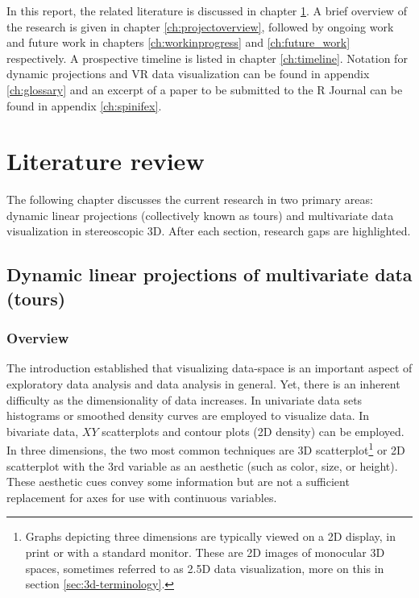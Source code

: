 \documentclass{monashthesis}
\begin{document}
In this report, the related literature is discussed in chapter
\ref{ch:lit_review}. A brief overview of the research is given in
chapter \ref{ch:projectoverview}, followed by ongoing work and future
work in chapters \ref{ch:workinprogress} and \ref{ch:future_work}
respectively. A prospective timeline is listed in chapter
\ref{ch:timeline}. Notation for dynamic projections and VR data
visualization can be found in appendix \ref{ch:glossary} and an excerpt
of a paper to be submitted to the R Journal can be found in appendix
\ref{ch:spinifex}.

\chapter{Literature review}\label{ch:lit_review}

The following chapter discusses the current research in two primary
areas: dynamic linear projections (collectively known as tours) and
multivariate data visualization in stereoscopic 3D. After each section,
research gaps are highlighted.

\section{Dynamic linear projections of multivariate data
(tours)}\label{sec:tour}

\subsection{Overview}\label{overview}

The introduction established that visualizing data-space is an important
aspect of exploratory data analysis and data analysis in general. Yet,
there is an inherent difficulty as the dimensionality of data increases.
In univariate data sets histograms or smoothed density curves are
employed to visualize data. In bivariate data, \(XY\) scatterplots and
contour plots (2D density) can be employed. In three dimensions, the two
most common techniques are 3D
scatterplot\footnote{Graphs depicting three dimensions are typically viewed on a 2D display, in print or with a standard monitor. These are 2D images of monocular 3D spaces, sometimes referred to as 2.5D data visualization, more on this in section \ref{sec:3d-terminology}.}
or 2D scatterplot with the 3rd variable as an aesthetic (such as color,
size, or height). These aesthetic cues convey some information but are
not a sufficient replacement for axes for use with continuous variables.
\end{document}

